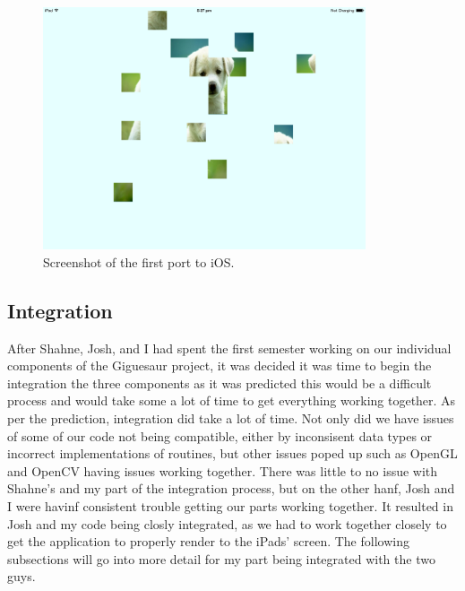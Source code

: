 \documentclass{article}
\begin{document}
\begin{figure}[ht]
\begin{center}
\includegraphics[width=0.85\textwidth]{images/iPadPortImage}
\caption{Screenshot of the first port to iOS.}
\label{fig:iPadPort}
\end{center}
\end{figure}

\subsection{Integration}
After Shahne, Josh, and I had spent the first semester working on our individual
components of the Giguesaur project, it was decided it was time to begin the
integration the three components as it was predicted this would be a difficult
process and would take some a lot of time to get everything working together. As
per the prediction, integration did take a lot of time. Not only did we have
issues of some of our code not being compatible, either by inconsisent data
types or incorrect implementations of routines, but other issues poped up such
as OpenGL and OpenCV having issues working together. There was little to no
issue with Shahne's and my part of the integration process, but on the other
hanf, Josh and I were havinf consistent trouble getting our parts working
together. It resulted in Josh and my code being closly integrated, as we had to
work together closely to get the application to properly render to the iPads'
screen. The following subsections will go into more detail for my part being
integrated with the two guys.
\end{document}
